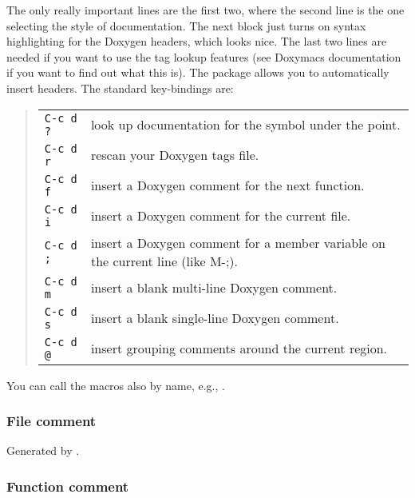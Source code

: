The only really important lines are the first two, where the second
line is the one selecting the style of documentation. The next block
just turns on syntax highlighting for the Doxygen headers, which looks
nice. The last two lines are needed if you want to use the tag lookup
features (see Doxymacs documentation if you want to find out what this
is).  The package allows you to automatically insert headers. The
standard key-bindings are:
\begin{quote}
\begin{tabularx}{.8\hsize}{@{}lX}
\texttt{C-c d ?} & look up documentation for the symbol under the point.\\
\texttt{C-c d r} & rescan your Doxygen tags file.\\
\texttt{C-c d f} & insert a Doxygen comment for the next function.\\
\texttt{C-c d i} & insert a Doxygen comment for the current file.\\
\texttt{C-c d ;} & insert a Doxygen comment for a member variable on the current line (like M-;).\\
\texttt{C-c d m} & insert a blank multi-line Doxygen comment.\\
\texttt{C-c d s} & insert a blank single-line Doxygen comment.\\
\texttt{C-c d @} & insert grouping comments around the current region.\\
\end{tabularx}
\end{quote}
You can call the macros also by name, e.g., .

\subsubsection{File comment}

Generated by .


\subsubsection{Function comment}

